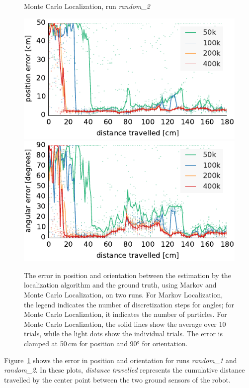 \documentclass[letterpaper, 10pt, conference]{ieeeconf}
\newcommand{\Fig}[1]{Figure~\ref{fig:#1}}
\begin{document}
\begin{figure}
\begin{center}
Monte Carlo Localization, run \emph{random\_2}
\end{center}
\includegraphics{mcl-whole_random_2-xy}\hfill
\includegraphics{mcl-whole_random_2-theta}

\caption{The error in position and orientation between the estimation by the localization algorithm and the ground truth, using Markov and Monte Carlo Localization, on two runs.
For Markov Localization, the legend indicates the number of discretization steps for angles; for Monte Carlo Localization, it indicates the number of particles.
For Monte Carlo Localization, the solid lines show the average over 10 trials, while the light dots show the individual trials.
The error is clamped at 50\,cm for position and 90° for orientation.}
\label{fig:whole-runs-random12}
\end{figure}

\Fig{whole-runs-random12} shows the error in position and orientation for runs \emph{random\_1} and \emph{random\_2}.
In these plots, \emph{distance travelled} represents the cumulative distance travelled by the center point between the two ground sensors of the robot.
\end{document}
